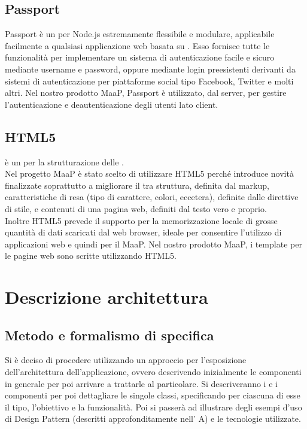 \subsection{Passport}
Passport è un  per Node.js estremamente flessibile e modulare, applicabile facilmente a qualsiasi applicazione web basata su . Esso fornisce tutte le funzionalità per implementare un sistema di autenticazione facile e sicuro mediante username e password, oppure mediante login preesistenti derivanti da sistemi di autenticazione per piattaforme social tipo Facebook, Twitter e molti altri.
Nel nostro prodotto MaaP, Passport è utilizzato, dal server, per gestire l'autenticazione e deautenticazione degli utenti lato client.

\subsection{HTML5}
 è un  per la strutturazione delle .\\
Nel progetto MaaP è stato scelto di utilizzare HTML5 perché introduce novità finalizzate soprattutto a migliorare il  tra struttura, definita dal markup, caratteristiche di resa (tipo di carattere, colori, eccetera), definite dalle direttive di stile, e contenuti di una pagina web, definiti dal testo vero e proprio.\\
Inoltre HTML5 prevede il supporto per la memorizzazione locale di grosse quantità di dati scaricati dal web browser, ideale per consentire l'utilizzo di applicazioni web e quindi per il  MaaP.
Nel nostro prodotto MaaP, i template per le pagine web sono scritte utilizzando HTML5.

\newpage
\section{Descrizione architettura}
\subsection{Metodo e formalismo di specifica}
Si è deciso di procedere utilizzando un approccio  per l'esposizione dell'architettura dell'applicazione, ovvero descrivendo inizialmente le componenti in generale per poi arrivare a trattarle al particolare.
Si descriveranno i  e i componenti per poi dettagliare le singole classi, specificando per ciascuna di esse il tipo, l'obiettivo e la funzionalità. Poi si passerà ad illustrare degli esempi d'uso di Design Pattern (descritti approfonditamente nell' A) e le tecnologie utilizzate.

